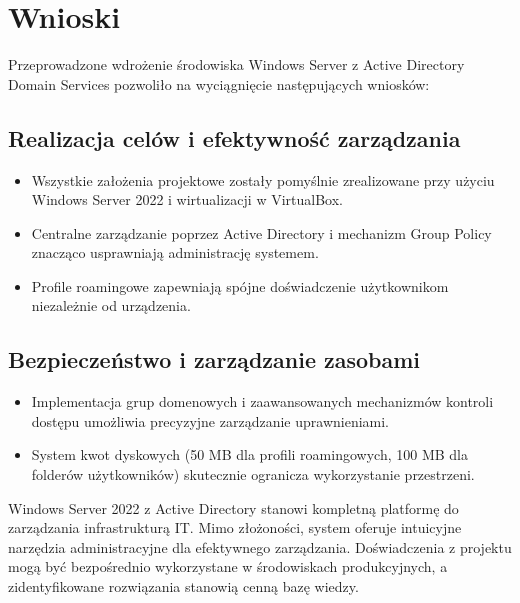 \newpage
\section{Wnioski}	%

Przeprowadzone wdrożenie środowiska Windows Server z Active Directory Domain Services pozwoliło na wyciągnięcie następujących wniosków:

\subsection{Realizacja celów i efektywność zarządzania}
\begin{itemize}
	\item Wszystkie założenia projektowe zostały pomyślnie zrealizowane przy użyciu Windows Server 2022 i wirtualizacji w VirtualBox.
	\item Centralne zarządzanie poprzez Active Directory i mechanizm Group Policy znacząco usprawniają administrację systemem.
	\item Profile roamingowe zapewniają spójne doświadczenie użytkownikom niezależnie od urządzenia.
\end{itemize}

\subsection{Bezpieczeństwo i zarządzanie zasobami}
\begin{itemize}
	\item Implementacja grup domenowych i zaawansowanych mechanizmów kontroli dostępu umożliwia precyzyjne zarządzanie uprawnieniami.
	\item System kwot dyskowych (50 MB dla profili roamingowych, 100 MB dla folderów użytkowników) skutecznie ogranicza wykorzystanie przestrzeni.
\end{itemize}



Windows Server 2022 z Active Directory stanowi kompletną platformę do zarządzania infrastrukturą IT. Mimo złożoności, system oferuje intuicyjne narzędzia administracyjne dla efektywnego zarządzania. Doświadczenia z projektu mogą być bezpośrednio wykorzystane w środowiskach produkcyjnych, a zidentyfikowane rozwiązania stanowią cenną bazę wiedzy.
